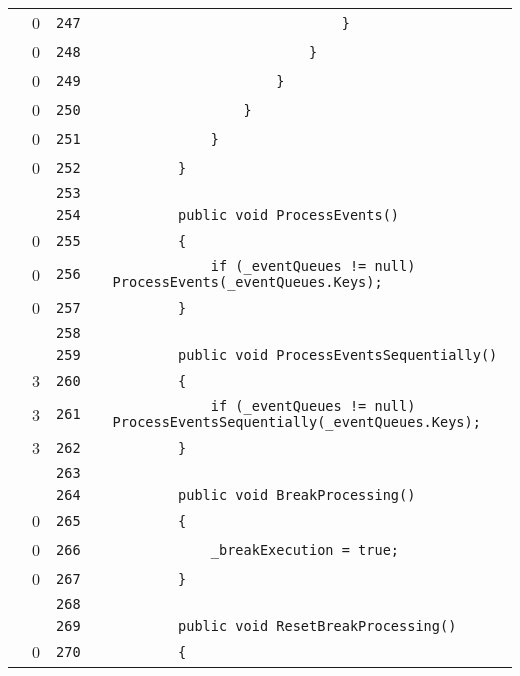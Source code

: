 \documentclass[a4paper,landscape,10pt]{article}
\begin{document}
\begin{longtable}[l]{lrrll}
\cellcolor{red} & 0 & \verb~247~ & & \verb~                            }~\\
\cellcolor{red} & 0 & \verb~248~ & & \verb~                        }~\\
\cellcolor{red} & 0 & \verb~249~ & & \verb~                    }~\\
\cellcolor{red} & 0 & \verb~250~ & & \verb~                }~\\
\cellcolor{red} & 0 & \verb~251~ & & \verb~            }~\\
\cellcolor{red} & 0 & \verb~252~ & & \verb~        }~\\
\cellcolor{gray} &  & \verb~253~ & & \verb~~\\
\cellcolor{gray} &  & \verb~254~ & & \verb~        public void ProcessEvents()~\\
\cellcolor{red} & 0 & \verb~255~ & & \verb~        {~\\
\cellcolor{red} & 0 & \verb~256~ & & \verb~            if (_eventQueues != null) ProcessEvents(_eventQueues.Keys);~\\
\cellcolor{red} & 0 & \verb~257~ & & \verb~        }~\\
\cellcolor{gray} &  & \verb~258~ & & \verb~~\\
\cellcolor{gray} &  & \verb~259~ & & \verb~        public void ProcessEventsSequentially()~\\
\cellcolor{green} & 3 & \verb~260~ & & \verb~        {~\\
\cellcolor{orange} & 3 & \verb~261~ & & \verb~            if (_eventQueues != null) ProcessEventsSequentially(_eventQueues.Keys);~\\
\cellcolor{green} & 3 & \verb~262~ & & \verb~        }~\\
\cellcolor{gray} &  & \verb~263~ & & \verb~~\\
\cellcolor{gray} &  & \verb~264~ & & \verb~        public void BreakProcessing()~\\
\cellcolor{red} & 0 & \verb~265~ & & \verb~        {~\\
\cellcolor{red} & 0 & \verb~266~ & & \verb~            _breakExecution = true;~\\
\cellcolor{red} & 0 & \verb~267~ & & \verb~        }~\\
\cellcolor{gray} &  & \verb~268~ & & \verb~~\\
\cellcolor{gray} &  & \verb~269~ & & \verb~        public void ResetBreakProcessing()~\\
\cellcolor{red} & 0 & \verb~270~ & & \verb~        {~\\

\end{longtable}
\end{document}
